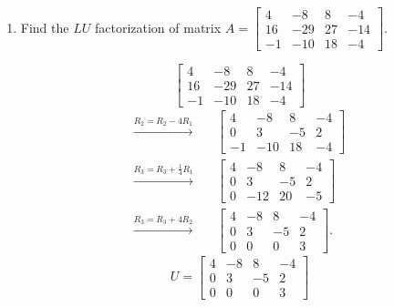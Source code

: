 \documentclass{zc-ust-hw}
\begin{document}
\begin{enumerate}
\begin{enumerate}
      \item Find the $LU$ factorization of matrix $A=\begin{bmatrix} 4&-8&8&-4\\16&-29&27&-14\\-1&-10&18&-4 \end{bmatrix}$.
        \begin{sol}
          \begin{equation}
            \begin{bmatrix}
              4  & -8  & 8  & -4  \\
              16 & -29 & 27 & -14 \\
              -1 & -10 & 18 & -4
            \end{bmatrix}
          \end{equation}
          \begin{align}
            \xrightarrow{R_2 = R_2 - 4R_1}
            \quad
            &\begin{bmatrix}
              4  & -8  & 8  & -4 \\
              0  & 3   & -5 & 2  \\
              -1 & -10 & 18 & -4
            \end{bmatrix} \\
            \xrightarrow{R_3 = R_3 + \frac{1}{4}R_1}
            \quad
            &\begin{bmatrix}
              4 & -8  & 8  & -4 \\
              0 & 3   & -5 & 2  \\
              0 & -12 & 20 & -5
            \end{bmatrix} \\
            \xrightarrow{R_3 = R_3 + 4R_2}
            \quad
            &\begin{bmatrix}
              4 & -8 & 8  & -4 \\
              0 & 3  & -5 & 2  \\
              0 & 0  & 0  & 3
            \end{bmatrix}
          .\end{align}
          \begin{equation}
            U = \begin{bmatrix} 4 & -8 & 8 & -4 \\ 0 & 3 & -5 & 2 \\ 0 & 0 & 0 & 3 \end{bmatrix}
          \end{equation}
          \begin{gather}

\end{gather}
\end{sol}
\end{enumerate}
\end{enumerate}
\end{document}

